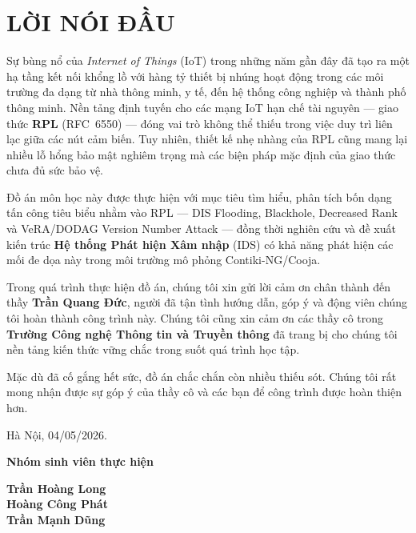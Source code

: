 \section*{LỜI NÓI ĐẦU}
{}
\thispagestyle{empty}

Sự bùng nổ của \textit{Internet of Things} (IoT) trong những năm gần đây đã tạo
ra một hạ tầng kết nối khổng lồ với hàng tỷ thiết bị nhúng hoạt động trong các
môi trường đa dạng từ nhà thông minh, y tế, đến hệ thống công nghiệp và thành
phố thông minh. Nền tảng định tuyến cho các mạng IoT hạn chế tài nguyên
--- giao thức \textbf{RPL} (RFC~6550) --- đóng vai trò không thể thiếu trong
việc duy trì liên lạc giữa các nút cảm biến. Tuy nhiên, thiết kế nhẹ nhàng
của RPL cũng mang lại nhiều lỗ hổng bảo mật nghiêm trọng mà các biện pháp mặc
định của giao thức chưa đủ sức bảo vệ.

Đồ án môn học này được thực hiện với mục tiêu tìm hiểu, phân tích bốn dạng
tấn công tiêu biểu nhằm vào RPL --- DIS Flooding, Blackhole, Decreased Rank và
VeRA/DODAG Version Number Attack --- đồng thời nghiên cứu và đề xuất kiến trúc
\textbf{Hệ thống Phát hiện Xâm nhập} (IDS) có khả năng phát hiện các mối đe
dọa này trong môi trường mô phỏng Contiki-NG/Cooja.

Trong quá trình thực hiện đồ án, chúng tôi xin gửi lời cảm ơn chân thành đến
thầy \textbf{Trần Quang Đức}, người đã tận tình hướng dẫn, góp ý và động viên chúng tôi
hoàn thành công trình này. Chúng tôi cũng xin cảm ơn các thầy cô trong \textbf{Trường
Công nghệ Thông tin và Truyền thông} đã trang bị cho chúng tôi nền tảng kiến thức vững chắc trong suốt
quá trình học tập.

Mặc dù đã cố gắng hết sức, đồ án chắc chắn còn nhiều thiếu sót. Chúng tôi rất mong
nhận được sự góp ý của thầy cô và các bạn để công trình được hoàn thiện hơn.

\vspace{1cm}
\begin{flushright}
Hà Nội, 04/05/2026.

\vspace{0.5cm}
\textbf{Nhóm sinh viên thực hiện}

\vspace{2cm}
\textbf{Trần Hoàng Long} \\
\textbf{Hoàng Công Phát} \\
\textbf{Trần Mạnh Dũng}
\end{flushright}

\cleardoublepage